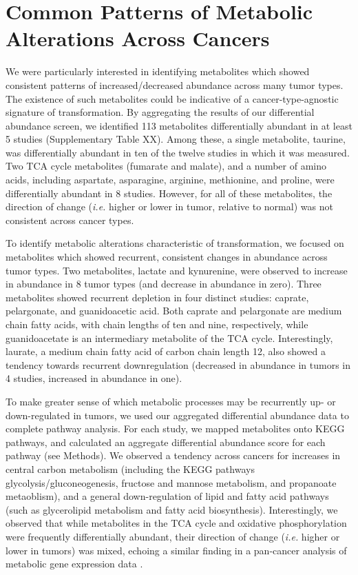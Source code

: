 \documentclass[10pt]{article}
\begin{document}
\section{ Common Patterns of Metabolic Alterations Across Cancers}
We were particularly interested in identifying metabolites which showed consistent patterns of increased/decreased abundance across many tumor types. The existence of such metabolites could be indicative of a cancer-type-agnostic signature of transformation. By aggregating the results of our differential abundance screen, we identified 113 metabolites differentially abundant in at least 5 studies (Supplementary Table XX). Among these, a single metabolite, taurine, was differentially abundant in ten of the twelve studies in which it was measured. Two TCA cycle metabolites (fumarate and malate), and a number of amino acids, including aspartate, asparagine, arginine, methionine, and proline, were differentially abundant in 8 studies. However, for all of these metabolites, the direction of change (\textit{i.e.} higher or lower in tumor, relative to normal) was not consistent across cancer types.

To identify metabolic alterations characteristic of transformation, we focused on metabolites which showed recurrent, consistent changes in abundance across tumor types. Two metabolites, lactate and kynurenine, were observed to increase in abundance in 8 tumor types (and decrease in abundance in zero). Three metabolites showed recurrent depletion in four distinct studies: caprate, pelargonate, and guanidoacetic acid. Both caprate and pelargonate are medium chain fatty acids, with chain lengths of ten and nine, respectively, while guanidoacetate is an intermediary metabolite of the TCA cycle. Interestingly, laurate, a medium chain fatty acid of carbon chain length 12, also showed a tendency towards recurrent downregulation (decreased in abundance in tumors in 4 studies, increased in abundance in one). 

To make greater sense of which metabolic processes may be recurrently up- or down-regulated in tumors, we used our aggregated differential abundance data to complete pathway analysis. For each study, we mapped metabolites onto KEGG pathways, and calculated an aggregate differential abundance score for each pathway (see Methods). We observed a tendency across cancers for increases in central carbon metabolism (including the KEGG pathways glycolysis/gluconeogenesis, fructose and mannose metabolism, and propanoate metaoblism), and a general down-regulation of lipid and fatty acid pathways (such as glycerolipid metabolism and fatty acid biosynthesis). Interestingly, we observed that while metabolites in the TCA cycle and oxidative phosphorylation were frequently differentially abundant, their direction of change (\textit{i.e.} higher or lower in tumors) was mixed, echoing a similar finding in a pan-cancer analysis of metabolic gene expression data \cite{Hu2013}.
\end{document}
